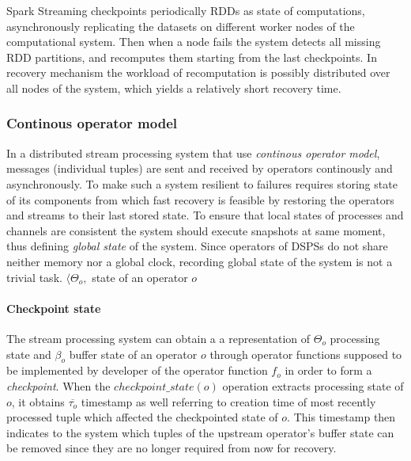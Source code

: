 Spark Streaming checkpoints periodically RDDs as state of computations, asynchronously replicating the datasets on different worker nodes of the computational system. Then when a node fails the system detects all missing RDD partitions, and recomputes them starting from the last checkpoints. In recovery mechanism the workload of recomputation is possibly distributed over all nodes of the system, which yields a relatively short recovery time.


\subsubsection{Continous operator model}

In a distributed stream processing system that use \textit{continous operator model},  messages (individual tuples) are sent and received by operators continously and asynchronously. To make such a system resilient to failures requires storing state of its components from which fast recovery is feasible by restoring the operators and streams to their last stored state. To ensure that local states of processes and channels are consistent the system should execute snapshots at same moment, thus defining  \textit{global state} of the system.
 Since operators of DSPSs do not share neither memory nor a global clock, recording global state of the system is not a trivial task.
$\langle\Theta_o, $ state of an operator $o$
\cite{introsnapshot}


\paragraph{Checkpoint state} 
The stream processing system can obtain a a representation of $\Theta_o$ processing state and $\beta_o$ buffer state of an operator $o$ through operator functions supposed to be implemented by developer of the operator function $f_o$ in order to form a \textit{checkpoint}. When the $checkpoint\_state(o)$ operation extracts processing state of $o$, it obtains $\overline{\tau_o}$ timestamp as well referring to creation time of most recently processed tuple which affected the checkpointed state of $o$. This timestamp then indicates to the system which tuples of the upstream  operator's buffer state can be removed since they are no longer required from now for recovery.

